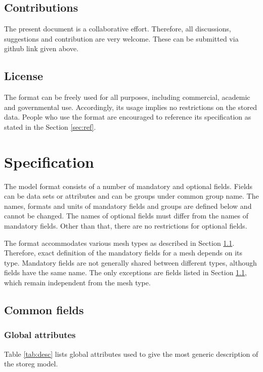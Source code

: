 \documentclass[10pt,a4paper]{article}
\begin{document}
\subsection{Contributions}

The present document is a collaborative effort. Therefore, all discussions, suggestions and contribution are very welcome. These can be submitted via github link given above. 

\subsection{License}

The format can be freely used for all purposes, including commercial, academic and governmental use. Accordingly, its usage implies no restrictions on the stored data. People who use the format are encouraged to reference its specification as stated in the Section \ref{sec:ref}.

\section{Specification}

The model format consists of a number of mandatory and optional fields. Fields can be data sets or attributes and can be groups under common group name. The names, formats and units of mandatory fields and groups are defined below and cannot be changed. The names of optional fields must differ from the names of mandatory fields. Other than that, there are no restrictions for optional fields.

The format accommodates various mesh types as described in Section \ref{sec:common}. Therefore, exact definition of the mandatory fields for a mesh depends on its type. Mandatory fields are not generally shared between different types, although fields have the same name. The only exceptions are fields listed in Section \ref{sec:common}, which remain independent from the mesh type.

\subsection{Common fields}
\label{sec:common}

\subsubsection{Global attributes}

Table \ref{tab:desc} lists global attributes used to give the most generic description of the storeg model.
\end{document}
